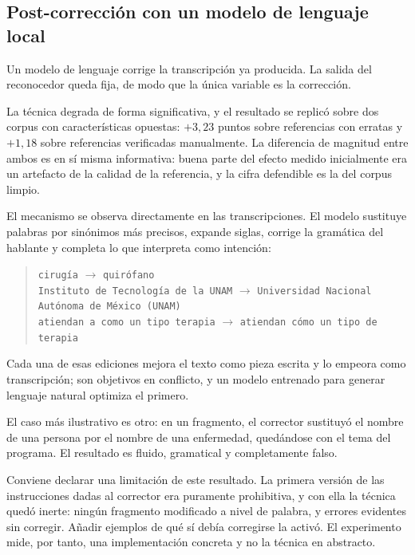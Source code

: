 \subsection{Post-corrección con un modelo de lenguaje local}

Un modelo de lenguaje corrige la transcripción ya producida. La salida del reconocedor
queda fija, de modo que la única variable es la corrección.

La técnica degrada de forma significativa, y el resultado se replicó sobre dos corpus con
características opuestas: $+3{,}23$ puntos sobre referencias con erratas y $+1{,}18$ sobre
referencias verificadas manualmente. La diferencia de magnitud entre ambos es en sí misma
informativa: buena parte del efecto medido inicialmente era un artefacto de la calidad de
la referencia, y la cifra defendible es la del corpus limpio.

El mecanismo se observa directamente en las transcripciones. El modelo sustituye palabras
por sinónimos más precisos, expande siglas, corrige la gramática del hablante y completa lo
que interpreta como intención:

\begin{quote}
\texttt{cirugía} $\rightarrow$ \texttt{quirófano} \\
\texttt{Instituto de Tecnología de la UNAM} $\rightarrow$ \texttt{Universidad Nacional
Autónoma de México (UNAM)} \\
\texttt{atiendan a como un tipo terapia} $\rightarrow$ \texttt{atiendan cómo un tipo de
terapia}
\end{quote}

Cada una de esas ediciones mejora el texto como pieza escrita y lo empeora como
transcripción; son objetivos en conflicto, y un modelo entrenado para generar lenguaje
natural optimiza el primero.

El caso más ilustrativo es otro: en un fragmento, el corrector sustituyó el nombre de una
persona por el nombre de una enfermedad, quedándose con el tema del programa. El resultado
es fluido, gramatical y completamente falso.

Conviene declarar una limitación de este resultado. La primera versión de las instrucciones
dadas al corrector era puramente prohibitiva, y con ella la técnica quedó inerte: ningún
fragmento modificado a nivel de palabra, y errores evidentes sin corregir. Añadir ejemplos
de qué sí debía corregirse la activó. El experimento mide, por tanto, una implementación
concreta y no la técnica en abstracto.

